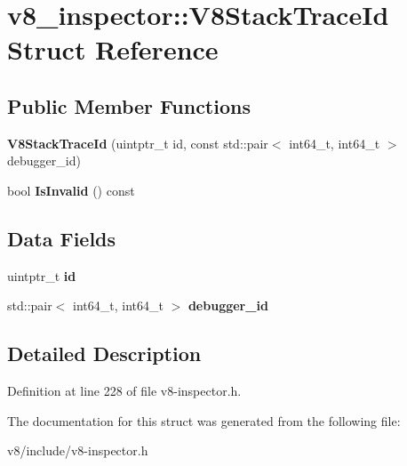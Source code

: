 \hypertarget{structv8__inspector_1_1V8StackTraceId}{}\section{v8\+\_\+inspector\+:\+:V8\+Stack\+Trace\+Id Struct Reference}
\label{structv8__inspector_1_1V8StackTraceId}
\subsection*{Public Member Functions}
\begin{DoxyCompactItemize}
\item 
\mbox{\label{structv8__inspector_1_1V8StackTraceId_a229d85e0a584d86a881b6ef575b1a9a2}} 
{\bfseries V8\+Stack\+Trace\+Id} (uintptr\+\_\+t id, const std\+::pair$<$ int64\+\_\+t, int64\+\_\+t $>$ debugger\+\_\+id)
\item 
\mbox{\label{structv8__inspector_1_1V8StackTraceId_a20fd4c6fe649f6663b7855f38681a211}} 
bool {\bfseries Is\+Invalid} () const
\end{DoxyCompactItemize}
\subsection*{Data Fields}
\begin{DoxyCompactItemize}
\item 
\mbox{\label{structv8__inspector_1_1V8StackTraceId_ad9e65194b2f95f1a9b98fdc76af8dae2}} 
uintptr\+\_\+t {\bfseries id}
\item 
\mbox{\label{structv8__inspector_1_1V8StackTraceId_aa64ad33eb9a49a373f87aaa5e0964500}} 
std\+::pair$<$ int64\+\_\+t, int64\+\_\+t $>$ {\bfseries debugger\+\_\+id}
\end{DoxyCompactItemize}


\subsection{Detailed Description}


Definition at line 228 of file v8-\/inspector.\+h.



The documentation for this struct was generated from the following file\+:\begin{DoxyCompactItemize}
\item 
v8/include/v8-\/inspector.\+h\end{DoxyCompactItemize}
